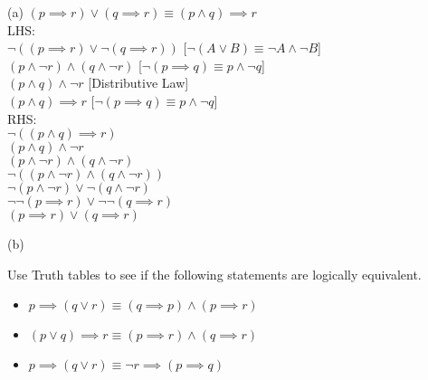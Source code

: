 \documentclass[addpoints]{exam}
\newenvironment{problem}[2][Problem]{\begin{trivlist}
    \item[\hskip \labelsep {\bfseries #1}\hskip \labelsep {\bfseries #2.}]}{\end{trivlist}}
\begin{document}
\begin{sloppypar}
\begin{problem}{7}
\end{problem}

\begin{questions}
    \question
    \begin{solution}
        
        (a) $ (p \implies r) \lor (q \implies r)  \equiv  (p \land q) \implies r $ \\ 
        LHS: \\ 
        $ \neg((p \implies r) \lor \neg(q \implies r)) $ \hspace{10mm} {\color{red} [$ \neg (A \lor B) \equiv \neg A \land \neg B $]}\\ 
        $ (p \land \neg r) \land (q \land \neg r) $ \hspace{21.5mm} {\color{red} [$ \neg (p \implies q) \equiv p \land \neg q $]}\\ 
        $ (p \land q) \land \neg r $ \hspace{31mm} { \color{red} [Distributive Law]}\\ 
        $ (p \land q) \implies r $ \hspace{27.5mm} { \color{red} [$ \neg (p\implies q) \equiv p \land \neg q $]} \\ 
        RHS: \\ 
        $ \neg ((p \land q) \implies r) $ \\ 
        $ (p \land q) \land \neg r $ \\ 
        $ (p \land \neg r) \land (q \land \neg r) $ \\ 
        $ \neg ((p \land \neg r) \land (q \land \neg r)) $ \\ 
        $ \neg (p \land \neg r) \lor \neg(q \land \neg r) $ \\ 
        $ \neg \neg (p \implies r) \lor \neg \neg (q \implies r) $ \\ 
        $ (p \implies r) \lor (q \implies r) $ 

        \vspace{2mm}
        (b)
    \end{solution}
\end{questions}

\begin{problem}{8}
Use Truth tables to see if the following statements are logically equivalent.
\begin{itemize}
    \item [(a)] $ p \implies (q \lor r) \equiv (q \implies p) \land (p \implies r) $
    \item [(b)] $ (p \lor q) \implies r \equiv (p \implies r) \land (q \implies r) $
    \item [(c)] $ p \implies (q \lor r) \equiv \neg r \implies ( p \implies q) $
\end{itemize}

\end{problem}

\begin{questions}
    \question
    \begin{solution}
        
    \end{solution}

\end{questions}
\end{sloppypar}
\end{document}
